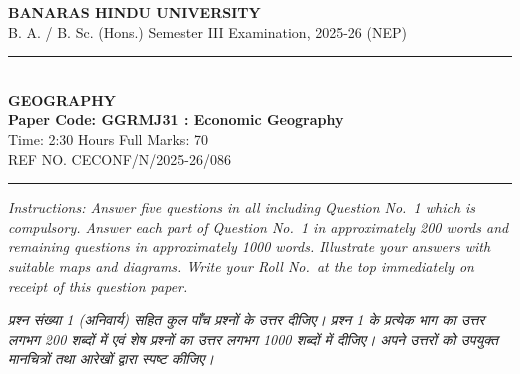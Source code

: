 \documentclass[11pt,a4paper]{article}
\begin{document}
\begin{center}
  {\large\bfseries BANARAS HINDU UNIVERSITY}\\[2pt]
  {\normalsize B. A. / B. Sc. (Hons.) Semester III Examination, 2025-26 (NEP)}\\[6pt]
  \rule{0.8\linewidth}{0.5pt}\\[6pt]
  {\large\bfseries GEOGRAPHY}\\[4pt]
  {\large\bfseries Paper Code: GGRMJ31 : Economic Geography}\\[4pt]
  {\normalsize Time: 2:30 Hours \hfill Full Marks: 70}\\[2pt]
  {\small REF NO. CECONF/N/2025-26/086}
\end{center}
\rule{\linewidth}{0.4pt}
\smallskip

\noindent \textit{Instructions: Answer five questions in all including Question No.\ 1 which is compulsory. Answer each part of Question No.\ 1 in approximately 200 words and remaining questions in approximately 1000 words. Illustrate your answers with suitable maps and diagrams. Write your Roll No.\ at the top immediately on receipt of this question paper.}

\smallskip
\noindent \textit{प्रश्न संख्या 1 (अनिवार्य) सहित कुल पाँच प्रश्नों के उत्तर दीजिए। प्रश्न 1 के प्रत्येक भाग का उत्तर लगभग 200 शब्दों में एवं शेष प्रश्नों का उत्तर लगभग 1000 शब्दों में दीजिए। अपने उत्तरों को उपयुक्त मानचित्रों तथा आरेखों द्वारा स्पष्ट कीजिए।}

\bigskip
\end{document}
